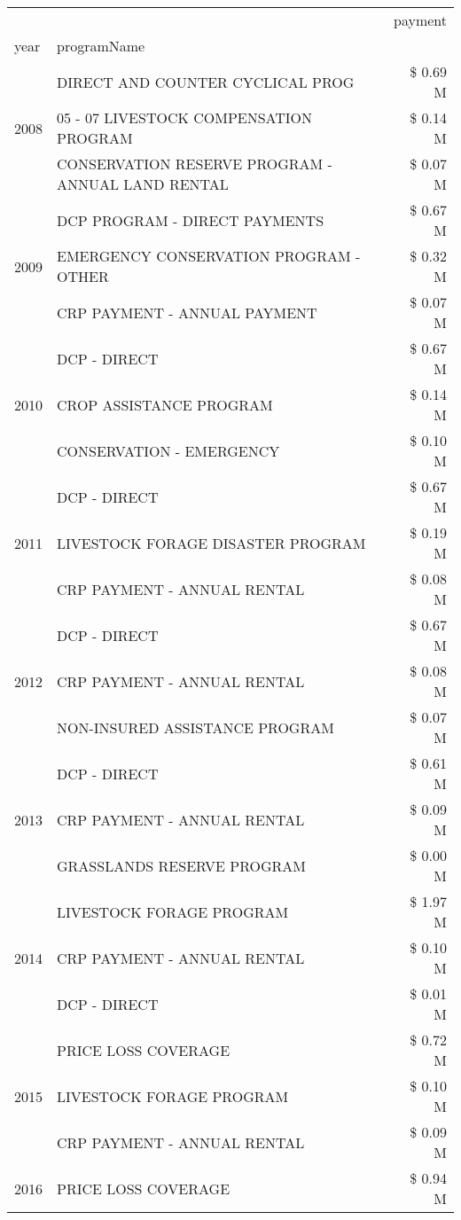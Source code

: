 \begin{tabular}{llr}
\toprule
 &  & payment \\
year & programName &  \\
\midrule
\multirow[t]{3}{*}{2008} & DIRECT AND COUNTER CYCLICAL PROG & \$ 0.69 M \\
 & 05 - 07 LIVESTOCK COMPENSATION PROGRAM & \$ 0.14 M \\
 & CONSERVATION RESERVE PROGRAM - ANNUAL LAND RENTAL & \$ 0.07 M \\
\cline{1-3}
\multirow[t]{3}{*}{2009} & DCP PROGRAM - DIRECT PAYMENTS & \$ 0.67 M \\
 & EMERGENCY CONSERVATION PROGRAM - OTHER & \$ 0.32 M \\
 & CRP PAYMENT - ANNUAL PAYMENT & \$ 0.07 M \\
\cline{1-3}
\multirow[t]{3}{*}{2010} & DCP - DIRECT & \$ 0.67 M \\
 & CROP ASSISTANCE PROGRAM & \$ 0.14 M \\
 & CONSERVATION - EMERGENCY & \$ 0.10 M \\
\cline{1-3}
\multirow[t]{3}{*}{2011} & DCP - DIRECT & \$ 0.67 M \\
 & LIVESTOCK FORAGE DISASTER PROGRAM & \$ 0.19 M \\
 & CRP PAYMENT - ANNUAL RENTAL & \$ 0.08 M \\
\cline{1-3}
\multirow[t]{3}{*}{2012} & DCP - DIRECT & \$ 0.67 M \\
 & CRP PAYMENT - ANNUAL RENTAL & \$ 0.08 M \\
 & NON-INSURED ASSISTANCE PROGRAM & \$ 0.07 M \\
\cline{1-3}
\multirow[t]{3}{*}{2013} & DCP - DIRECT & \$ 0.61 M \\
 & CRP PAYMENT - ANNUAL RENTAL & \$ 0.09 M \\
 & GRASSLANDS RESERVE PROGRAM & \$ 0.00 M \\
\cline{1-3}
\multirow[t]{3}{*}{2014} & LIVESTOCK FORAGE PROGRAM & \$ 1.97 M \\
 & CRP PAYMENT - ANNUAL RENTAL & \$ 0.10 M \\
 & DCP - DIRECT & \$ 0.01 M \\
\cline{1-3}
\multirow[t]{3}{*}{2015} & PRICE LOSS COVERAGE & \$ 0.72 M \\
 & LIVESTOCK FORAGE PROGRAM & \$ 0.10 M \\
 & CRP PAYMENT - ANNUAL RENTAL & \$ 0.09 M \\
\cline{1-3}
\multirow[t]{3}{*}{2016} & PRICE LOSS COVERAGE & \$ 0.94 M \\

\end{tabular}
